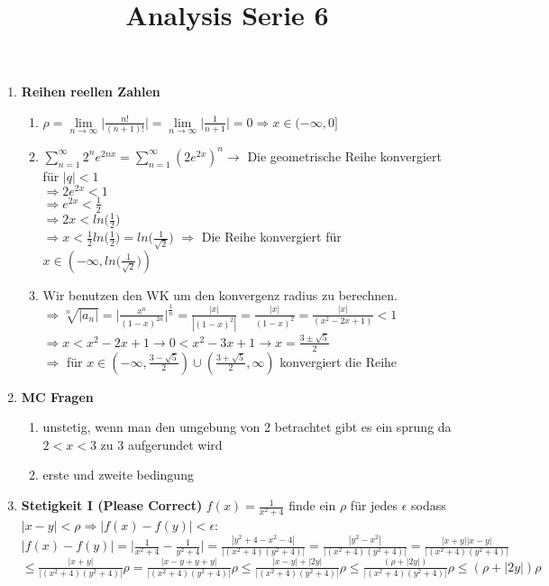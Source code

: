 \documentclass[8pt]{extreport}
\title{Analysis Serie 6}
\begin{document}
\begin{enumerate}[label = \textbf{6.\arabic*}]
\item \textbf{Reihen reellen Zahlen}
\begin{enumerate}[label = (\alph*)]
\item $\rho = \lim\limits_{n \to \infty}\big|\frac{n!}{(n+1)!}\big| = \lim\limits_{n \to \infty}\big|\frac{1}{n+1}\big| = 0 \Rightarrow x \in  (-\infty, 0 ]$
\item $\displaystyle\sum_{n=1}^{\infty}2^n e^{2nx} = \displaystyle\sum_{n=1}^{\infty}(2e^{2x})^n \rightarrow $ Die geometrische Reihe konvergiert für $|q| < 1$ \\
$\Rightarrow 2e^{2x} < 1$\\
$\Rightarrow e^{2x} < \frac{1}{2}$\\
$\Rightarrow 2x < ln\big(\frac{1}{2}\big)$\\
$\Rightarrow x < \frac{1}{2}ln\big(\frac{1}{2}\big) = ln\big(\frac{1}{\sqrt{2}}\big)$
$\Rightarrow$ Die Reihe konvergiert für $ x \in (-\infty, ln\big(\frac{1}{\sqrt{2}}\big) )$
\item  Wir benutzen den WK um den konvergenz radius zu berechnen.\\
$\Rightarrow \sqrt[n]{|a_n|} = \bigg|\frac{x^n}{(1-x)^{2n}}\bigg|^\frac{1}{n} = \frac{|x|}{|(1-x)^2|} = \frac{|x|}{(1-x)^2} = \frac{|x|}{(x^2 -2x +1)} < 1$\\
$\Rightarrow x < x^2-2x+1 \rightarrow 0 < x^2 - 3x + 1 \rightarrow x =\frac{3 \pm \sqrt{5}}{2} $\\
$\Rightarrow$ für $x \in (-\infty,\frac{3 - \sqrt{5}}{2}) \cup (\frac{3 + \sqrt{5}}{2}, \infty)$ konvergiert die Reihe
\end{enumerate}
\item \textbf{MC Fragen}
\begin{enumerate}[label = (\alph*)]
\item unstetig, wenn man den umgebung von 2 betrachtet gibt es ein sprung da $2 <x <3$ zu 3 aufgerundet wird
\item erste und zweite bedingung
\end{enumerate}
\item \textbf{Stetigkeit I (Please Correct)}
$f(x) = \frac{1}{x^2 + 4}$ finde ein $\rho$ für jedes $\epsilon$ sodass $|x -y| < \rho \Rightarrow |f(x) -f(y)| < \epsilon$:\\
$|f(x) -f(y)| = \big|\frac{1}{x^2 + 4}- \frac{1}{y^2+4}\big| = \frac{|y^2 + 4 - x^2 -4|}{|(x^2 + 4)(y^2+4)|} = \frac{|y^2 -x^2|}{|(x^2 + 4)(y^2+4)|} = \frac{|x+y| |x-y|}{|(x^2 + 4)(y^2+4)|}$\\ $\leq \frac{|x+y|}{|(x^2 + 4)(y^2+4)|}\rho = \frac{|x-y+y+y|}{|(x^2 + 4)(y^2+4)|}\rho \leq  \frac{|x-y| + |2y|}{|(x^2 + 4)(y^2+4)|}\rho \leq \frac{(\rho + |2y|)}{|(x^2 + 4)(y^2+4)|}\rho \leq (\rho + |2y|)\rho$ \\

\end{enumerate}
\end{document}
